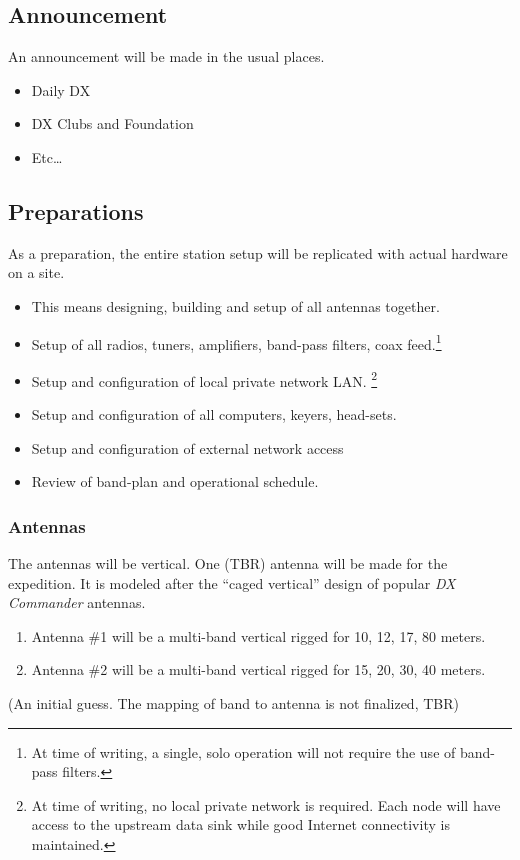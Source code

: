 \documentclass[11pt]{article}
\begin{document}
\subsection{Announcement}

An announcement will be made in the usual places.

\begin{itemize}
\item Daily DX
\item DX Clubs and Foundation
\item Etc\ldots
\end{itemize}

\subsection{Preparations}

As a preparation, the entire station setup will be replicated with actual
hardware on a site.

\begin{itemize}
\item This means designing, building and setup of all antennas together.
\item Setup of all radios, tuners, amplifiers, band-pass filters,
coax feed.\footnote{At time of writing, a single, solo
operation will not require the use of band-pass filters.}
\item Setup and configuration of local private network LAN.
\footnote{At time of writing, no local private network is required. Each
node will have access to the upstream data sink while good Internet
connectivity is maintained.}
\item Setup and configuration of all computers, keyers, head-sets.
\item Setup and configuration of external network access
\item Review of band-plan and operational schedule.
\end{itemize}

\subsubsection{Antennas}

The antennas will be vertical.   One (TBR) antenna will be made for
the expedition.  It is modeled after the ``caged vertical''
design of popular {\textit{DX Commander}} antennas.
\par
\begin{enumerate}
\item Antenna \#1 will be a multi-band vertical rigged for 10, 12, 17, 80
meters.
\item Antenna \#2 will be a multi-band vertical rigged for 15, 20, 30, 40
meters.
\end{enumerate}
\par
(An initial guess. The mapping of band to antenna is not finalized, TBR)
\par
\end{document}
